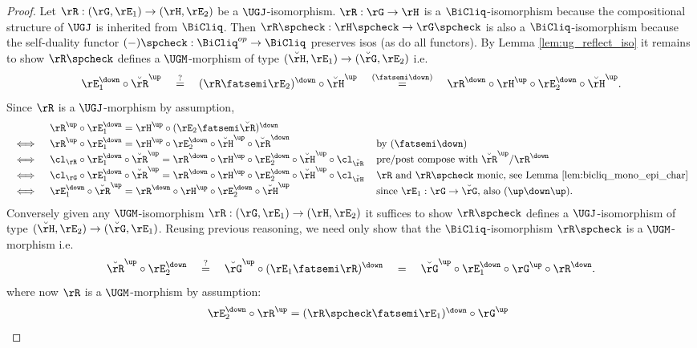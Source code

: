 \documentclass{article}
\begin{document}
\begin{proof}
Let $\rR : (\rG,\rE_1) \to (\rH,\rE_2)$ be a $\UGJ$-isomorphism. $\rR : \rG \to \rH$ is a $\BiCliq$-isomorphism because the compositional structure of $\UGJ$ is inherited from $\BiCliq$. Then $\rR\spcheck : \rH\spcheck \to \rG\spcheck$ is also a $\BiCliq$-isomorphism because the self-duality functor $(-)\spcheck : \BiCliq^{op} \to \BiCliq$ preserves isos (as do all functors). By Lemma \ref{lem:ug_reflect_iso} it remains to show  $\rR\spcheck$ defines a $\UGM$-morphism of type $(\breve{\rH},\rE_1) \to (\breve{\rG},\rE_2)$  i.e.\
\[
\rE_1^\down \circ \breve{\rR}^\up 
\quad \stackrel{?}{=} \quad (\rR \fatsemi \rE_2)^\down \circ \breve{\rH}^\up
\quad \stackrel{(\fatsemi\down)}{=} \quad \rR^\down \circ \rH^\up \circ \rE_2^\down \circ \breve{\rH}^\up.
\]
Since $\rR$ is a $\UGJ$-morphism by assumption,
\[
\begin{tabular}{lll}
&
$\rR^\up \circ \rE_1^\down = \rH^\up \circ (\rE_2 \fatsemi \breve{\rR})^\down$
\\ $\iff$ &
$\rR^\up \circ \rE_1^\down = \rH^\up \circ \rE_2^\down \circ \breve{\rH}^\up \circ \breve{\rR}^\down$
& by $(\fatsemi\down)$
\\ $\iff$ &
$\cl_\rR \circ \rE_1^\down \circ \breve{\rR}^\up = \rR^\down \circ \rH^\up \circ \rE_2^\down \circ \breve{\rH}^\up \circ \cl_{\breve{\rR}}$
& pre/post compose with $\breve{\rR}^\up$/$\rR^\down$
\\ $\iff$ &
$\cl_\rG \circ \rE_1^\down \circ \breve{\rR}^\up = \rR^\down \circ \rH^\up \circ \rE_2^\down \circ \breve{\rH}^\up \circ \cl_{\breve{\rH}}$
& $\rR$ and $\rR\spcheck$ monic, see Lemma \ref{lem:bicliq_mono_epi_char}
\\ $\iff$ &
$\rE_1^\down \circ \breve{\rR}^\up = \rR^\down \circ \rH^\up \circ \rE_2^\down \circ \breve{\rH}^\up$
& since $\rE_1 : \rG \to \breve{\rG}$, also $(\up\down\up)$.
\end{tabular}
\]
Conversely given any $\UGM$-isomorphism $\rR : (\rG,\rE_1) \to (\rH,\rE_2)$ it suffices to show $\rR\spcheck$ defines a $\UGJ$-isomorphism of type $(\breve{\rH},\rE_2) \to (\breve{\rG},\rE_1)$. Reusing previous reasoning, we need only show that the $\BiCliq$-isomorphism $\rR\spcheck$ is a $\UGM$-morphism i.e.\
\[
\breve{\rR}^\up \circ \rE_2^\down
\quad \stackrel{?}{=} \quad
\breve{\rG}^\up \circ (\rE_1 \fatsemi \rR)^\down
\quad = \quad \breve{\rG}^\up \circ \rE_1^\down \circ \rG^\up \circ \rR^\down.
\]
where now $\rR$ is a $\UGM$-morphism by assumption:
\[
\begin{tabular}{lll}
&
$\rE_2^\down \circ \rR^\up = (\rR\spcheck \fatsemi \rE_1)^\down \circ \rG^\up$

\end{tabular}\]
\end{proof}
\end{document}
